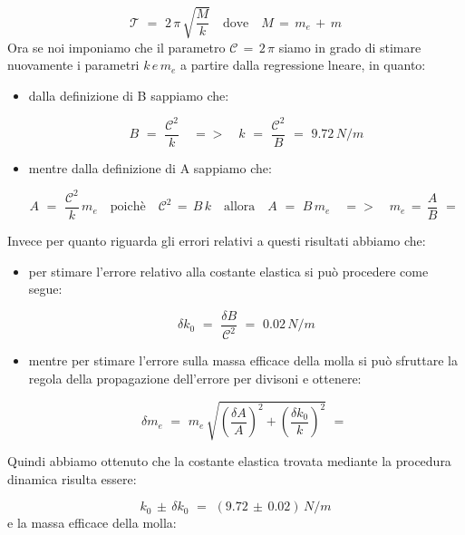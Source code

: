 \begin{equation}
	\mathcal{T} \,\,=\,\, 2 \, \pi \, \sqrt{\frac{M}{k}} \quad \text{dove} \quad M \,=\, m_e\,+\,m
\end{equation}
%
Ora se noi imponiamo che il parametro $\mathcal{C} \,=\, 2\,\pi$ siamo in grado di stimare nuovamente i parametri $k \,e\, m_e$ a partire dalla regressione lneare, in quanto:
\begin{itemize}
	\item{dalla definizione di B sappiamo che:
	
			\begin{equation*}
				B \,\,=\,\, \frac{\mathcal{C}^2}{k} \quad => \quad k \,\,=\,\, \frac{\mathcal{C}^2}{B} \,\,=\,\, 9.72 \, N/m
			\end{equation*}}
	\item{mentre dalla definizione di A sappiamo che:
	
			\begin{equation*}
				A \,\,=\,\, \frac{\mathcal{C}^2}{k} \, m_e \quad \text{poichè} \quad \mathcal{C}^2 \,=\, B\,k \quad \text{allora} \quad A \,\,=\,\, B\,m_e \quad => \quad m_e \,=\, \frac{A}{B} \,\,=\,\,
			\end{equation*}}
\end{itemize}
Invece per quanto riguarda gli errori relativi a questi risultati abbiamo che:
\begin{itemize}
	\item{per stimare l'errore relativo alla costante elastica si può procedere come segue:
	
			\begin{equation*}
				\delta k_0 \,\,=\,\, \frac{\delta B}{\mathcal{C}^2} \,\,=\,\, 0.02 \, N/m
			\end{equation*}
			}
	\item{mentre per stimare l'errore sulla massa efficace della molla si può sfruttare la regola della propagazione dell'errore per divisoni e ottenere:
	
			\begin{equation*}
				\delta m_e \,\,=\,\, m_e \, \sqrt{(\frac{\delta A}{A})^2 + (\frac{\delta k_0}{k})^2} \,\,=\,\,	
			\end{equation*}
			}
\end{itemize}
Quindi abbiamo ottenuto che la costante elastica trovata mediante la procedura dinamica risulta essere:

\begin{equation*}
	k_0 \, \pm \, \delta k_0 \,\,=\,\, (9.72 \, \pm \, 0.02) \, N/m
\end{equation*}
%
e la massa efficace della molla:

